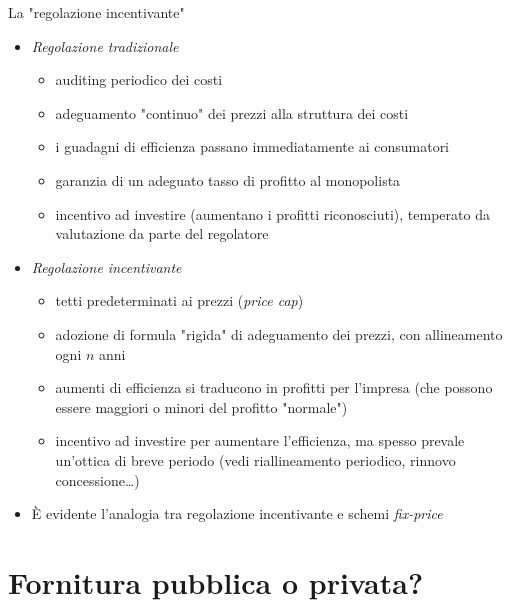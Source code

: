 \documentclass[aspectratio=64,11pt]{beamer}
\begin{document}
\begin{frame}{La "regolazione incentivante"}
\begin{itemize}
\item \emph{Regolazione tradizionale}
\begin{itemize}
\item auditing periodico dei costi
\item adeguamento "continuo" dei prezzi alla struttura dei costi
\item i guadagni di efficienza passano immediatamente ai consumatori
\item garanzia di un adeguato tasso di profitto al monopolista
\item incentivo ad investire (aumentano i profitti riconosciuti), temperato da
valutazione da parte del regolatore
\end{itemize}
\item \emph{Regolazione incentivante}
\begin{itemize}
\item tetti predeterminati ai prezzi (\emph{price cap})
\item adozione di formula "rigida" di adeguamento dei prezzi, con allineamento
ogni $n$ anni
\item aumenti di efficienza si traducono in profitti per l'impresa (che possono
essere maggiori o minori del profitto "normale")
\item incentivo ad investire per aumentare l'efficienza, ma spesso prevale
un'ottica di breve periodo (vedi riallineamento periodico, rinnovo
concessione\ldots{})
\end{itemize}
\item È evidente l'analogia tra regolazione incentivante e schemi \emph{fix-price}
\end{itemize}
\end{frame}

\section{Fornitura pubblica o privata?}
\end{document}
